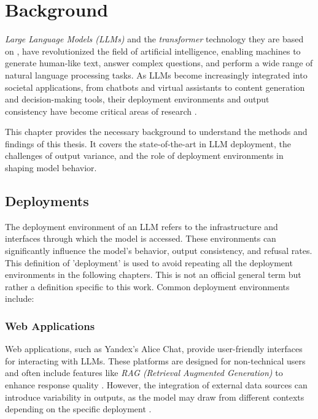 \chapter{Background}\label{chap:background}

\textit{Large Language Models (LLMs)} and the \textit{transformer} technology they are based on \autocite{NIPS2017_3f5ee243}, have revolutionized the field of artificial intelligence, enabling machines to generate human-like text, answer complex questions, and perform a wide range of natural language processing tasks. As LLMs become increasingly integrated into societal applications, from chatbots and virtual assistants to content generation and decision-making tools, their deployment environments and output consistency have become critical areas of research \autocite{gallegosBiasFairnessLarge2024}.

This chapter provides the necessary background to understand the methods and findings of this thesis. It covers the state-of-the-art in LLM deployment, the challenges of output variance, and the role of deployment environments in shaping model behavior.

\section{Deployments}

The deployment environment of an LLM refers to the infrastructure and interfaces through which the model is accessed. These environments can significantly influence the model's behavior, output consistency, and refusal rates. This definition of 'deployment' is used to avoid repeating all the deployment environments in the following chapters. This is not an official general term but rather a definition specific to this work. Common deployment environments include:

\subsection{Web Applications}

Web applications, such as Yandex's Alice Chat, provide user-friendly interfaces for interacting with LLMs. These platforms are designed for non-technical users and often include features like \textit{RAG (Retrieval Augmented Generation)} to enhance response quality \autocite{lewisRetrievalaugmentedGenerationKnowledgeintensive2020}. However, the integration of external data sources can introduce variability in outputs, as the model may draw from different contexts depending on the specific deployment \autocite{saad-falconARESAutomatedEvaluation2024}.

